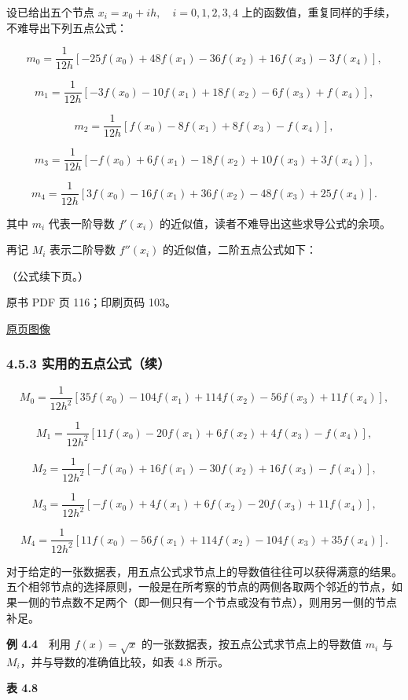 设已给出五个节点 \(x_i=x_0+ih,\quad i=0,1,2,3,4\) 上的函数值，重复同样的手续，不难导出下列五点公式：

\[
m_0=\frac1{12h}[-25f(x_0)+48f(x_1)-36f(x_2)+16f(x_3)-3f(x_4)],
\]

\[
m_1=\frac1{12h}[-3f(x_0)-10f(x_1)+18f(x_2)-6f(x_3)+f(x_4)],
\]

\[
m_2=\frac1{12h}[f(x_0)-8f(x_1)+8f(x_3)-f(x_4)],
\]

\[
m_3=\frac1{12h}[-f(x_0)+6f(x_1)-18f(x_2)+10f(x_3)+3f(x_4)],
\]

\[
m_4=\frac1{12h}[3f(x_0)-16f(x_1)+36f(x_2)-48f(x_3)+25f(x_4)].
\]

其中 \(m_i\) 代表一阶导数 \(f'(x_i)\) 的近似值，读者不难导出这些求导公式的余项。

再记 \(M_i\) 表示二阶导数 \(f''(x_i)\) 的近似值，二阶五点公式如下：

（公式续下页。）

\clearpage

原书 PDF 页 116；印刷页码 103。

\href{source-images/pdf-116.jpeg}{原页图像}

\subsubsection{4.5.3 实用的五点公式（续）}\label{ch04b-ux5b9eux7528ux7684ux4e94ux70b9ux516cux5f0fux7eed}

\[
M_0=\frac1{12h^2}[35f(x_0)-104f(x_1)+114f(x_2)-56f(x_3)+11f(x_4)],
\]

\[
M_1=\frac1{12h^2}[11f(x_0)-20f(x_1)+6f(x_2)+4f(x_3)-f(x_4)],
\]

\[
M_2=\frac1{12h^2}[-f(x_0)+16f(x_1)-30f(x_2)+16f(x_3)-f(x_4)],
\]

\[
M_3=\frac1{12h^2}[-f(x_0)+4f(x_1)+6f(x_2)-20f(x_3)+11f(x_4)],
\]

\[
M_4=\frac1{12h^2}[11f(x_0)-56f(x_1)+114f(x_2)-104f(x_3)+35f(x_4)].
\]

对于给定的一张数据表，用五点公式求节点上的导数值往往可以获得满意的结果。五个相邻节点的选择原则，一般是在所考察的节点的两侧各取两个邻近的节点，如果一侧的节点数不足两个（即一侧只有一个节点或没有节点），则用另一侧的节点补足。

\textbf{例 4.4}　利用 \(f(x)=\sqrt{x}\) 的一张数据表，按五点公式求节点上的导数值 \(m_i\) 与 \(M_i\)，并与导数的准确值比较，如表 4.8 所示。

\textbf{表 4.8}


